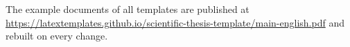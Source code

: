 The example documents of all templates are published at \url{https://latextemplates.github.io/scientific-thesis-template/main-english.pdf} and rebuilt on every change.

